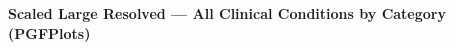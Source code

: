\documentclass[a4paper,10pt]{article}
\begin{document}
\begin{center}
{\Large\bfseries Scaled Large Resolved — All Clinical Conditions by Category (PGFPlots)}\\[6pt]

\end{center}
\end{document}
